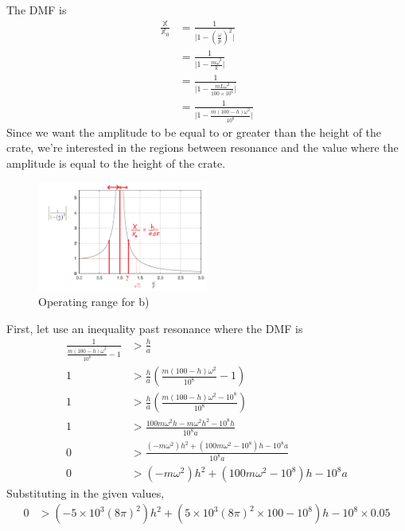 \subsection{}
The DMF is 
\begin{align*}
    \frac{\mathbb{X}}{\mathbb{X}_0} &= \frac{1}{\bigg| 1 - \left(\frac{\omega}{p}\right)^2 \bigg|} \\
    &= \frac{1}{\bigg| 1 - \frac{m\omega^2}{k} \bigg|} \\
    &= \frac{1}{\bigg| 1 - \frac{mL\omega^2}{100 \times 10^6} \bigg|} \\
    &= \frac{1}{\bigg| 1 - \frac{m(100 - h)\omega^2}{10^8} \bigg|} 
\end{align*}
Since we want the amplitude to be equal to or greater than the height of the crate, we're interested in the regions between resonance and the value where the amplitude is equal to the height of the crate.
\begin{figure}[h]
    \centering
    \includegraphics[width=0.5\textwidth]{Questions/Figures/q2 dmf.png}
    \caption{Operating range for b)}
\end{figure}
\FloatBarrier
First, let use an inequality past resonance where the DMF is
\begin{align*}
    \frac{1}{\frac{m(100 - h)\omega^2}{10^8} - 1} &> \frac{h}{a} \\
    1 &> \frac{h}{a} \left(\frac{m(100 - h)\omega^2}{10^8} - 1\right) \\
    1 &> \frac{h}{a} \left(\frac{m(100 - h)\omega^2 - 10^8}{10^8}\right) \\
    1 &> \frac{100m\omega^2h - m\omega^2h^2 - 10^8h}{10^8a} \\
    0 &> \frac{(-m\omega^2)h^2 + (100m\omega^2 - 10^8)h - 10^8a}{10^8a} \\
    0 &> (-m\omega^2)h^2 + (100m\omega^2 - 10^8)h - 10^8a 
\end{align*}
Substituting in the given values,
\begin{align*}
    0 &> (-5 \times 10^3(8\pi)^2)h^2 + (5 \times 10^3(8\pi)^2 \times 100 - 10^8)h - 10^8 \times 0.05 
\end{align*}
